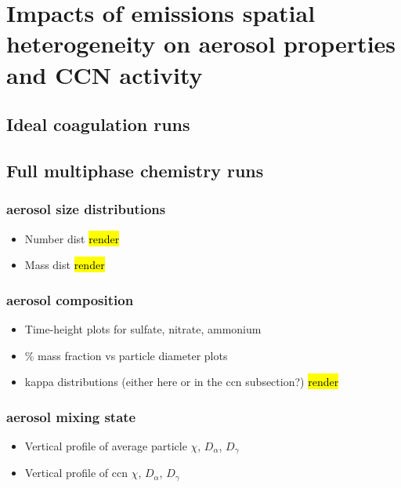 \chapter{Impacts of emissions spatial heterogeneity on aerosol properties and CCN activity}

\section{Ideal coagulation runs}


\section{Full multiphase chemistry runs}

\subsection{aerosol size distributions}
\begin{itemize}
\item Number dist \hl{render}
\item Mass dist \hl{render}
\end{itemize}

\subsection{aerosol composition}

\begin{itemize}
\item Time-height plots for sulfate, nitrate, ammonium
\item \% mass fraction vs particle diameter plots
\item kappa distributions (either here or in the ccn subsection?) \hl{render}
\end{itemize}

\subsection{aerosol mixing state}

\begin{itemize}
\item Vertical profile of average particle $\chi$, $D_{\alpha}$, $D_{\gamma}$
\item Vertical profile of ccn $\chi$, $D_{\alpha}$, $D_{\gamma}$
\end{itemize}

